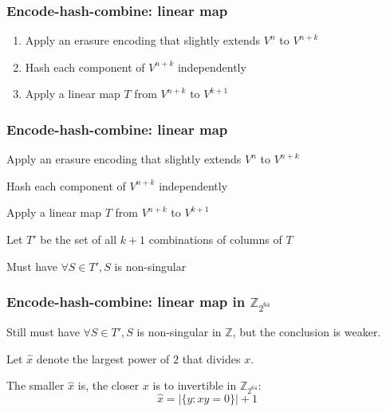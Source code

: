 \documentclass[xcolor=dvipsnames]{beamer}
\begin{document}



\begin{frame}
  \frametitle{Encode-hash-combine: linear map}
  \begin{enumerate}
  \item Apply an erasure encoding that slightly extends $V^n$ to $V^{n+k}$
  \item Hash each component of $V^{n+k}$ independently
  \item Apply a linear map $T$ from $V^{n+k}$ to $V^{k+1}$
  \end{enumerate}
\end{frame}


\begin{frame}
  \frametitle{Encode-hash-combine: linear map}

  \begin{enumerate}
{\color{gray}  \item Apply an erasure encoding that slightly extends $V^n$ to $V^{n+k}$}
{\color{gray}  \item Hash each component of $V^{n+k}$ independently}
  \item Apply a linear map $T$ from $V^{n+k}$ to $V^{k+1}$
  \end{enumerate}
$ $ \\
  Let $T'$ be the set of all $k+1$ combinations of columns of $T$

  \pause $ $ \\
  Must have $\forall S \in T', S$ is non-singular
\end{frame}

\begin{frame}

  \frametitle{Encode-hash-combine: linear map \textbf{ in $\mathbb{Z}_{2^{64}}$}}

  Still must have $\forall S \in T', S$ is non-singular in $\mathbb{Z}$, but the conclusion is weaker.
  \pause

  $ $\\
  Let $\widehat{x}$ denote the largest power of $2$ that divides $x$.
  \pause

  $ $\\
  The smaller $\widehat{x}$ is, the closer $x$ is to invertible in $\mathbb{Z}_{2^{64}}$:
  \[
  \widehat{x} = \left|\{y : xy = 0\}\right| + 1
  \]
\end{frame}
\end{document}
